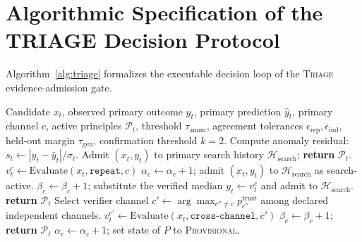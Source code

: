 \documentclass{article}
\newcommand{\triage}{\textsc{Triage}\,}
\begin{document}
\section{Algorithmic Specification of the TRIAGE Decision Protocol}
\label{app:pseudocode}

Algorithm~\ref{alg:triage} formalizes the executable decision loop of the \triage{} evidence-admission gate.

\begin{algorithm}[!ht]
\caption{The \triage{} Evidence-Admission Protocol}
\label{alg:triage}
\begin{algorithmic}[1]
\REQUIRE Candidate $x_t$, observed primary outcome $y_t$, primary prediction $\hat{y}_t$, primary channel $c$, active principles $\mathcal{P}_t$, threshold $\tau_{\mathrm{anom}}$, agreement tolerances $\epsilon_{\mathrm{rep}}, \epsilon_{\mathrm{ind}}$, held-out margin $\tau_{\mathrm{gen}}$, confirmation threshold $k=2$.
\STATE Compute anomaly residual: $s_t \leftarrow |y_t - \hat{y}_t| / \sigma_t$.
    \STATE Admit $(x_t, y_t)$ to primary search history $\mathcal{H}_{\mathrm{search}}$; \textbf{return} $\mathcal{P}_t$.
\ENDIF
\STATE {}
\STATE $v_t^{c} \leftarrow \mathrm{Evaluate}(x_t, \texttt{repeat}, c)$ 
    \STATE $\alpha_c \leftarrow \alpha_c + 1$; admit $(x_t, y_t)$ to $\mathcal{H}_{\mathrm{search}}$ as search-active.
\ELSE
    \STATE $\beta_c \leftarrow \beta_c + 1$; substitute the verified median $y_t \leftarrow v_t^{c}$ and admit to $\mathcal{H}_{\mathrm{search}}$.
    \STATE \textbf{return} $\mathcal{P}_t$ 
\ENDIF
\STATE {}
\STATE {}
    \STATE {}
    \STATE Select verifier channel $c' \leftarrow \arg\max_{c'' \neq c} p_{c''}^{\mathrm{trust}}$ among declared independent channels.
    \STATE $v_t^{c'} \leftarrow \mathrm{Evaluate}(x_t, \texttt{cross-channel}, c')$
        \STATE $\beta_{c} \leftarrow \beta_{c} + 1$; \textbf{return} $\mathcal{P}_t$ 
    \ENDIF
    \STATE $\alpha_{c} \leftarrow \alpha_{c} + 1$; set state of $P$ to \textsc{Provisional}.

\end{algorithmic}
\end{algorithm}
\end{document}
